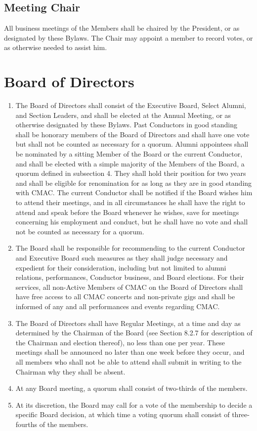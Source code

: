 \documentclass{article}
\begin{document}
\subsection{Meeting Chair}

All business meetings of the Members shall be chaired by the President,
or as designated by these Bylaws. The Chair may appoint a member to
record votes, or as otherwise needed to assist him.

\section{Board of Directors}
\begin{enumerate}
\item The Board of Directors shall consist of the Executive Board, Select
Alumni, and Section Leaders, and shall be elected at the Annual Meeting,
or as otherwise designated by these Bylaws. Past Conductors in good
standing shall be honorary members of the Board of Directors and shall
have one vote but shall not be counted as necessary for a quorum.
Alumni appointees shall be nominated by a sitting Member of the Board
or the current Conductor, and shall be elected with a simple majority
of the Members of the Board, a quorum defined in subsection 4. They
shall hold their position for two years and shall be eligible for
renomination for as long as they are in good standing with CMAC. The
current Conductor shall be notified if the Board wishes him to attend
their meetings, and in all circumstances he shall have the right to
attend and speak before the Board whenever he wishes, save for meetings
concerning his employment and conduct, but he shall have no vote and
shall not be counted as necessary for a quorum.
\item The Board shall be responsible for recommending to the current Conductor
and Executive Board such measures as they shall judge necessary and
expedient for their consideration, including but not limited to alumni
relations, performances, Conductor business, and Board elections.
For their services, all non-Active Members of CMAC on the Board of
Directors shall have free access to all CMAC concerts and non-private
gigs and shall be informed of any and all performances and events
regarding CMAC.
\item The Board of Directors shall have Regular Meetings, at a time and
day as determined by the Chairman of the Board (see Section 8.2.7
for description of the Chairman and election thereof), no less than
one per year. These meetings shall be announced no later than one
week before they occur, and all members who shall not be able to attend
shall submit in writing to the Chairman why they shall be absent.
\item At any Board meeting, a quorum shall consist of two-thirds of the
members.
\item At its discretion, the Board may call for a vote of the membership
to decide a specific Board decision, at which time a voting quorum
shall consist of three-fourths of the members.
\end{enumerate}
\end{document}
